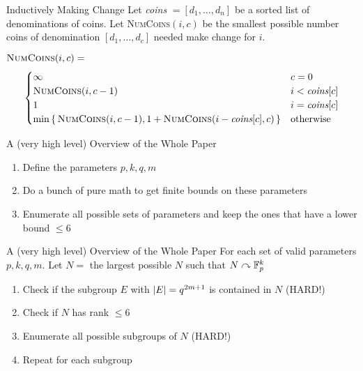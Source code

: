 \documentclass[aspectratio=169]{beamer}
\begin{document}
\begin{frame}{Inductively Making Change}
    Let \emph{coins} $= [d_1, \ldots, d_n]$ be a sorted list of denominations of coins.
    Let \textsc{NumCoins}$(i, c)$ be the smallest possible number coins of denomination $[d_1, \ldots, d_c]$ needed make change for $i$. 
    \vspace{10pt}
    
    $\textsc{NumCoins}(i, c) = $
    \[
        \begin{cases}
            \infty & c = 0 \\
            \textsc{NumCoins}(i, c - 1) & i < \textit{coins}[c] \\
            1 & i = \textit{coins}[c] \\
            \min\set{\textsc{NumCoins}(i, c - 1), 1 + \textsc{NumCoins}(i - \textit{coins}[c], c)} & \text{otherwise}
        \end{cases}
    \]
\end{frame}



\begin{frame}{A (very high level) Overview of the Whole Paper}
    \begin{enumerate}
        \item Define the parameters $p, k, q, m$ \pause
        \item Do a bunch of pure math to get finite bounds on these parameters
        \item Enumerate all possible sets of parameters and keep the ones that have a lower bound $\leq 6$
    \end{enumerate}
\end{frame}

\begin{frame}{A (very high level) Overview of the Whole Paper}
    For each set of valid parameters $p, k, q, m$.
    Let $N =$ the largest possible $N$ such that $N \curvearrowright \mathbb{F}_p^k$ \pause
    \begin{enumerate}
        \item Check if the subgroup $E$ with $\abs{E} = q^{2m + 1}$ is contained in $N$ \textcolor{sigma@alertred}{(HARD!)} \pause
        \item Check if $N$ has rank $\leq 6$ \pause
        \item Enumerate all possible subgroups of $N$ \textcolor{sigma@alertred}{(HARD!)} \pause
        \item Repeat for each subgroup
    \end{enumerate}
\end{frame}
\end{document}
